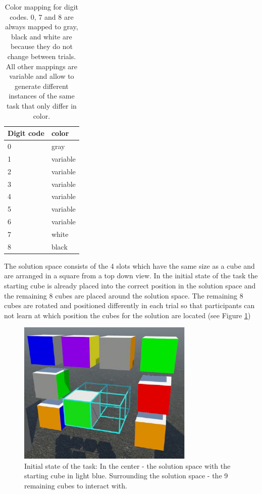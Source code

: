 \documentclass{article}
\begin{document}
\begin{table}
\begin{center}
    \begin{tabular}{| l | l |}
    \hline
    Digit code & color \\ \hline
    0 & gray \\ \hline
    1 & variable \\ \hline
    2 & variable \\ \hline
    3 & variable \\ \hline
    4 & variable \\ \hline
    5 & variable \\ \hline
    6 & variable \\ \hline
    7 & white \\ \hline
    8 & black \\ \hline
    \end{tabular}
\end{center}
\caption{Color mapping for digit codes. 0, 7 and 8 are always mapped to gray, black and white are because they do not change between trials. All other mappings are variable and allow to generate different instances of the same task that only differ in color. }
\label{tab:digit_coding}
\end{table}


The solution space consists of the 4 slots which have the same size as a cube and are arranged in a square from a top down view. In the initial state of the task the starting cube is already placed into the correct position in the solution space and the remaining 8 cubes are placed around the solution space. The remaining 8 cubes are rotated and positioned differently in each trial so that participants can not learn at which position the cubes for the solution are located (see Figure \ref{fig:vr_task_initialstate})

\begin{figure}[h]
\centering
\includegraphics[width=0.75\textwidth]{vr_task_initialstate}
\caption{Initial state of the task: In the center - the solution space with the starting cube in light blue. Surrounding the solution space - the 9 remaining cubes to interact with. }
\label{fig:vr_task_initialstate}
\end{figure}
\end{document}
